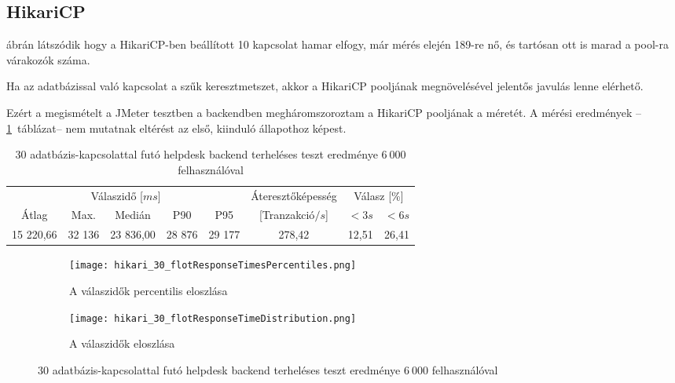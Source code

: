 \subsection{HikariCP}\label{sec:hikari}
 ábrán látszódik hogy a HikariCP-ben beállított 10 kapcsolat hamar elfogy, már mérés elején 189-re nő, és tartósan ott is marad a pool-ra várakozók száma.

Ha az adatbázissal való kapcsolat a szűk keresztmetszet, akkor a HikariCP pooljának megnövelésével jelentős javulás lenne elérhető.

Ezért a megismételt a JMeter tesztben a backendben megháromszoroztam a HikariCP pooljának a méretét. A mérési eredmények --\ref{tabl:hikari_30}~táblázat-- nem mutatnak eltérést az első, kiinduló állapothoz képest.

\begin{table}[hbt]
	\begin{tabular}{ccccc|c|cc}
		\multicolumn{5}{c|}{Válaszidő [$ms$]}  & Áteresztőképesség & \multicolumn{2}{c}{Válasz [\%]}	\\
		Átlag & Max. & Medián & P90 & P95 &	[Tranzakció$/s$] & $<3s$& $<6s$ \\
		\hline 
		15 220,66 & 32 136 & 23 836,00 & 28 876 & 29 177 & 278,42 & 12,51 & 26,41 \\
	\end{tabular} 
	\caption{30 adatbázis-kapcsolattal futó helpdesk backend terheléses teszt eredménye $6~000$ felhasználóval}
	\label{tabl:hikari_30}
\end{table}



\begin{figure}[hbt]
	\begin{subfigure}{.49\textwidth}
		\centering
		\texttt{[image: hikari\_30\_flotResponseTimesPercentiles.png]}  
		\caption{A válaszidők percentilis eloszlása}
	\end{subfigure}
	\begin{subfigure}{.49\textwidth}
		\centering
		\texttt{[image: hikari\_30\_flotResponseTimeDistribution.png]}  
		\caption{A válaszidők eloszlása}
	\end{subfigure}
	
	\caption[Helpdesk backend terheléses teszt módosított HikariCp beállításokkal]{30 adatbázis-kapcsolattal futó helpdesk backend terheléses teszt eredménye $6~000$ felhasználóval}
\end{figure}


